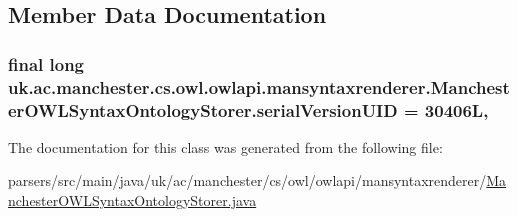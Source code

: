 \subsection{Member Data Documentation}
\hypertarget{classuk_1_1ac_1_1manchester_1_1cs_1_1owl_1_1owlapi_1_1mansyntaxrenderer_1_1_manchester_o_w_l_syntax_ontology_storer_a6165de32fbe32df06f6b994f85591a82}{
\subsubsection[{serial\-Version\-U\-I\-D}]{\setlength{\rightskip}{0pt plus 5cm}final long uk.\-ac.\-manchester.\-cs.\-owl.\-owlapi.\-mansyntaxrenderer.\-Manchester\-O\-W\-L\-Syntax\-Ontology\-Storer.\-serial\-Version\-U\-I\-D = 30406\-L\hspace{0.3cm}{\ttfamily [static]}, {\ttfamily [private]}}}\label{classuk_1_1ac_1_1manchester_1_1cs_1_1owl_1_1owlapi_1_1mansyntaxrenderer_1_1_manchester_o_w_l_syntax_ontology_storer_a6165de32fbe32df06f6b994f85591a82}


The documentation for this class was generated from the following file\-:\begin{DoxyCompactItemize}
\item 
parsers/src/main/java/uk/ac/manchester/cs/owl/owlapi/mansyntaxrenderer/\hyperlink{_manchester_o_w_l_syntax_ontology_storer_8java}{Manchester\-O\-W\-L\-Syntax\-Ontology\-Storer.\-java}\end{DoxyCompactItemize}
